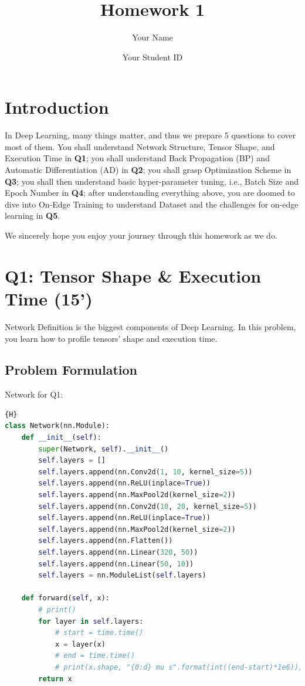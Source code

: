 \documentclass[12pt,a4paper]{article}
\theoremstyle{definition}
\begin{document}
\title{\textbf{Homework 1}}
\author{Your Name}
\date{Your Student ID}
\maketitle

\tableofcontents
\newpage

\section{Introduction}
In Deep Learning, many things matter, and thus we prepare 5 questions to cover most of them. You shall understand Network Structure, Tensor Shape, and Execution Time in \textbf{Q1}; you shall understand Back Propagation (BP) and Automatic Differentiation (AD) in \textbf{Q2}; you shall grasp Optimization Scheme in \textbf{Q3}; you shall then understand basic hyper-parameter tuning, i.e.,  Batch Size and Epoch Number in \textbf{Q4}; after understanding everything above, you are doomed to dive into On-Edge Training to understand Dataset and the challenges for on-edge learning in \textbf{Q5}. 

We sincerely hope you enjoy your journey through this homework as we do.

\section{Q1: Tensor Shape \& Execution Time (15')}
Network Definition is the biggest components of Deep Learning. In this problem, you learn how to profile tensors' shape and execution time.

\subsection{Problem Formulation}
Network for Q1:

\begin{lstlisting}[language=Python, label=network, caption=network structure]{H}
class Network(nn.Module):
    def __init__(self):
        super(Network, self).__init__()
        self.layers = []
        self.layers.append(nn.Conv2d(1, 10, kernel_size=5))
        self.layers.append(nn.ReLU(inplace=True))
        self.layers.append(nn.MaxPool2d(kernel_size=2))
        self.layers.append(nn.Conv2d(10, 20, kernel_size=5))
        self.layers.append(nn.ReLU(inplace=True))
        self.layers.append(nn.MaxPool2d(kernel_size=2))
        self.layers.append(nn.Flatten())
        self.layers.append(nn.Linear(320, 50))
        self.layers.append(nn.Linear(50, 10))
        self.layers = nn.ModuleList(self.layers)

    def forward(self, x):
        # print()
        for layer in self.layers:
            # start = time.time()
            x = layer(x)
            # end = time.time()
            # print(x.shape, "{0:d} mu s".format(int((end-start)*1e6)), sep=" ")
        return x
\end{lstlisting}
\end{document}
